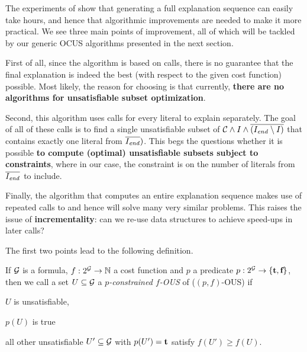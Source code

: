 The experiments of \citet{ecai/BogaertsGCG20} show that generating a full explanation sequence can easily take hours, and hence that algorithmic improvements are needed to make it more practical. 
We see three main points of improvement, all of which will be tackled by our generic OCUS algorithms presented in the next section. 
\begin{inparaenum}
 \item First of all, since the algorithm is based on  calls, there is no guarantee that the final explanation is indeed the best (with respect to the given cost function) possible. 
 Most likely, the reason for choosing  is that currently, \textbf{there are no algorithms for unsatisfiable subset optimization}. 
 \item Second, this algorithm uses  calls for every literal to explain separately. The goal of all of these calls is to find a single unsatisfiable subset of $\mathcal{C}  \land I \land \overline{(I_\mathit{end} \setminus I)}$ that contains exactly one literal from $\overline{I_\mathit{end} })$. This begs the questions whether it is possible \textbf{to compute (optimal) unsatisfiable subsets subject to constraints}, where in our case, the constraint is on the number of literals from $\overline{I_\mathit{end} }$ to include. 
 \item Finally, the algorithm that computes an entire explanation sequence makes use of repeated calls to \onestep and hence will solve many very similar problems. This raises the issue of \textbf{incrementality}: can we re-use data structures to achieve speed-ups in later calls? 
\end{inparaenum}

The first two points lead to the following definition. 


\begin{definition}
    If $\mathcal{G} $ is a formula, $f:2^{\mathcal{G} } \to \mathbb{N}$ a cost function and  $p$ a predicate $p: 2^{\mathcal{G} }\to \{\textbf{t},\textbf{f}\}$, then we call a set $U\subseteq \mathcal{G} $ a \emph{$p$-constrained $f$-OUS} of \formulag ($(p,f)$-OUS)  if \begin{compactitem}                                                                                                                                                                                                                         
    \item $U$ is unsatisfiable,
    \item $p(U)$ is true
    \item all other unsatisfiable $U'\subseteq \mathcal{G} $ with $p(U')=\textbf{t}$ satisfy $f(U')\geq f(U)$.                                                                                                                                                                                                                         \end{compactitem}
\end{definition}

